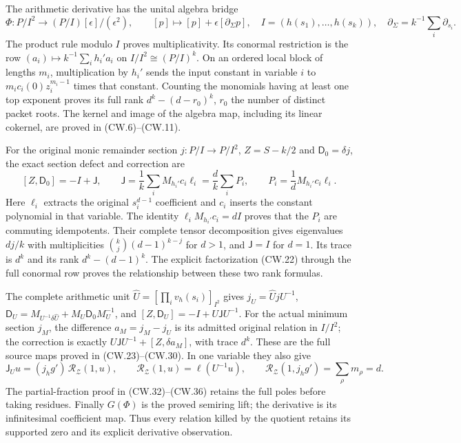 The arithmetic derivative has the unital algebra bridge
\[
 \Phi:P/I^2\longrightarrow (P/I)[\epsilon]/(\epsilon^2),
 \qquad [p]\longmapsto[p]+\epsilon[\partial_\Sigma p],
 \quad I=(h(s_1),\ldots,h(s_k)),\quad
 \partial_\Sigma=k^{-1}\sum_i\partial_{s_i}.
 \tag{R23}
\]
The product rule modulo \(I\) proves multiplicativity. Its
conormal restriction is the row
\((a_i)\mapsto k^{-1}\sum_i h_i'a_i\) on
\(I/I^2\cong(P/I)^k\). On an ordered local block of lengths
\(m_i\), multiplication by \(h_i'\) sends the input constant
in variable \(i\) to
\(m_ic_i(0)z_i^{m_i-1}\) times that constant. Counting the
monomials having at least one top exponent proves its full rank
\(d^k-(d-r_0)^k\), \(r_0\) the number of distinct packet roots.
The kernel and image of the algebra map, including its
linear cokernel, are proved in (CW.6)--(CW.11).

For the original monic remainder section \(j:P/I\to P/I^2\),
\(Z=S-k/2\) and \(\mathsf D_0=\delta j\), the exact section
defect and correction are
\[
 [Z,\mathsf D_0]=-I+\mathsf J,\qquad
 \mathsf J=\frac1k\sum_i M_{h_i'}c_i\ell_i
          =\frac d k\sum_iP_i,\qquad
 P_i=\frac1dM_{h_i'}c_i\ell_i .
 \tag{R24}
\]
Here \(\ell_i\) extracts the original \(s_i^{d-1}\) coefficient
and \(c_i\) inserts the constant polynomial in that variable.
The identity \(\ell_iM_{h_i'}c_i=dI\) proves that the \(P_i\)
are commuting idempotents. Their complete tensor decomposition
gives eigenvalues \(dj/k\) with multiplicities
\(\binom kj(d-1)^{k-j}\) for \(d>1\), and
\(\mathsf J=I\) for \(d=1\).
Its trace is \(d^k\) and its rank \(d^k-(d-1)^k\).
The explicit factorization (CW.22) through the full conormal row
proves the relationship between these two rank formulas.

The complete arithmetic unit
\(\widehat U=[\prod_i v_h(s_i)]_{I^2}\) gives
\(j_U=\widehat UjU^{-1}\),
\(\mathsf D_U=M_{U^{-1}\delta\widehat U}
+M_U\mathsf D_0M_U^{-1}\), and
\([Z,\mathsf D_U]=-I+U\mathsf JU^{-1}\).
For the actual minimum section \(j_M\), the difference
\(a_M=j_M-j_U\) is its admitted original relation in \(I/I^2\);
the correction is exactly
\(U\mathsf JU^{-1}+[Z,\delta a_M]\), with trace \(d^k\).
These are the full source maps proved in (CW.23)--(CW.30).
In one variable they also give
\[
 \mathsf J_Uu=(j_hg')\,\mathscr R_{\mathcal Z}(1,u),\qquad
 \mathscr R_{\mathcal Z}(1,u)=\ell(U^{-1}u),\qquad
 \mathscr R_{\mathcal Z}(1,j_hg')=\sum_\rho m_\rho=d .
 \tag{R25}
\]
The partial-fraction proof in (CW.32)--(CW.36) retains the
full poles before taking residues. Finally \(G(\Phi)\) is the
proved semiring lift; the derivative is its infinitesimal
coefficient map. Thus every relation killed by the quotient
retains its supported zero and its explicit derivative observation.

